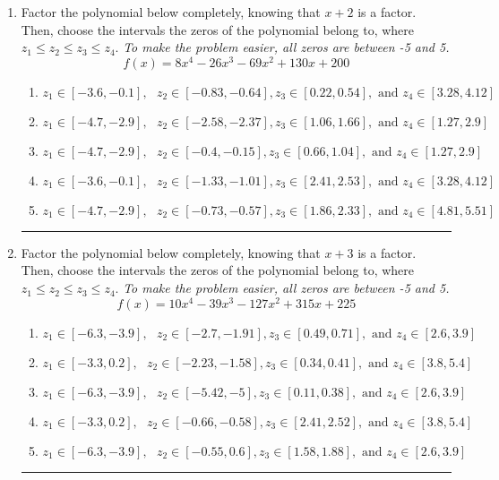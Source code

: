 \documentclass[14pt]{extbook}
\newcommand{\litem}[1]{\item#1\hspace*{-1cm}\rule{\textwidth}{0.4pt}}
\begin{document}
\begin{enumerate}
{\begin{enumerate}[label=\Alph*.]
\end{enumerate} }
\litem{
Factor the polynomial below completely, knowing that $x+2$ is a factor. Then, choose the intervals the zeros of the polynomial belong to, where $z_1 \leq z_2 \leq z_3 \leq z_4$. \textit{To make the problem easier, all zeros are between -5 and 5.}\[ f(x) = 8x^{4} -26 x^{3} -69 x^{2} +130 x + 200 \]\begin{enumerate}[label=\Alph*.]
\item \( z_1 \in [-3.6, -0.1], \text{   }  z_2 \in [-0.83, -0.64], z_3 \in [0.22, 0.54], \text{   and   } z_4 \in [3.28, 4.12] \)
\item \( z_1 \in [-4.7, -2.9], \text{   }  z_2 \in [-2.58, -2.37], z_3 \in [1.06, 1.66], \text{   and   } z_4 \in [1.27, 2.9] \)
\item \( z_1 \in [-4.7, -2.9], \text{   }  z_2 \in [-0.4, -0.15], z_3 \in [0.66, 1.04], \text{   and   } z_4 \in [1.27, 2.9] \)
\item \( z_1 \in [-3.6, -0.1], \text{   }  z_2 \in [-1.33, -1.01], z_3 \in [2.41, 2.53], \text{   and   } z_4 \in [3.28, 4.12] \)
\item \( z_1 \in [-4.7, -2.9], \text{   }  z_2 \in [-0.73, -0.57], z_3 \in [1.86, 2.33], \text{   and   } z_4 \in [4.81, 5.51] \)

\end{enumerate} }
\litem{
Factor the polynomial below completely, knowing that $x+3$ is a factor. Then, choose the intervals the zeros of the polynomial belong to, where $z_1 \leq z_2 \leq z_3 \leq z_4$. \textit{To make the problem easier, all zeros are between -5 and 5.}\[ f(x) = 10x^{4} -39 x^{3} -127 x^{2} +315 x + 225 \]\begin{enumerate}[label=\Alph*.]
\item \( z_1 \in [-6.3, -3.9], \text{   }  z_2 \in [-2.7, -1.91], z_3 \in [0.49, 0.71], \text{   and   } z_4 \in [2.6, 3.9] \)
\item \( z_1 \in [-3.3, 0.2], \text{   }  z_2 \in [-2.23, -1.58], z_3 \in [0.34, 0.41], \text{   and   } z_4 \in [3.8, 5.4] \)
\item \( z_1 \in [-6.3, -3.9], \text{   }  z_2 \in [-5.42, -5], z_3 \in [0.11, 0.38], \text{   and   } z_4 \in [2.6, 3.9] \)
\item \( z_1 \in [-3.3, 0.2], \text{   }  z_2 \in [-0.66, -0.58], z_3 \in [2.41, 2.52], \text{   and   } z_4 \in [3.8, 5.4] \)
\item \( z_1 \in [-6.3, -3.9], \text{   }  z_2 \in [-0.55, 0.6], z_3 \in [1.58, 1.88], \text{   and   } z_4 \in [2.6, 3.9] \)

\end{enumerate} }
\end{enumerate}
\end{document}
